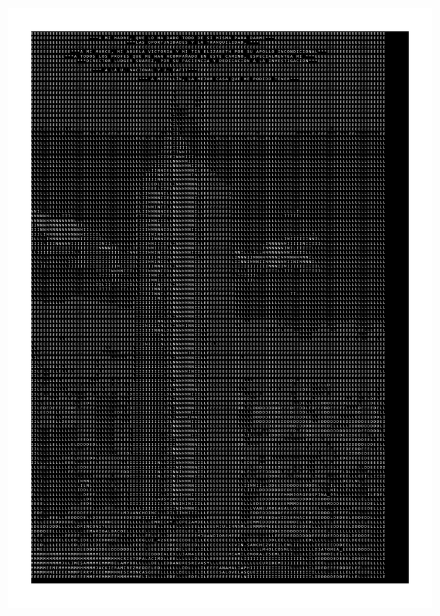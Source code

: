 \newpage
\thispagestyle{empty} \textbf{}\normalsize
\\\\\\%
\\\\
\begin{figure}[H]
\centering
\includegraphics[trim={0 0.1cm 2.2cm 0},clip,scale=0.8]{img/dedicatoria/dedicatoria.pdf}
\end{figure}

\newpage{\pagestyle{empty}\cleardoublepage}

